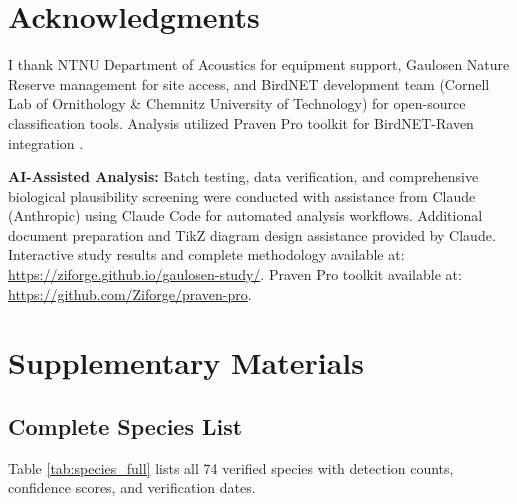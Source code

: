 \documentclass[twocolumn]{article}
\begin{document}
\section*{Acknowledgments}

I thank NTNU Department of Acoustics for equipment support, Gaulosen Nature Reserve management for site access, and BirdNET development team (Cornell Lab of Ornithology \& Chemnitz University of Technology) for open-source classification tools. Analysis utilized Praven Pro toolkit for BirdNET-Raven integration \citep{Redpath2025}.

\textbf{AI-Assisted Analysis:} Batch testing, data verification, and comprehensive biological plausibility screening were conducted with assistance from Claude (Anthropic) using Claude Code for automated analysis workflows. Additional document preparation and TikZ diagram design assistance provided by Claude. Interactive study results and complete methodology available at: \url{https://ziforge.github.io/gaulosen-study/}. Praven Pro toolkit available at: \url{https://github.com/Ziforge/praven-pro}.


\newpage
\onecolumn

\appendix
\section{Supplementary Materials}

\subsection{Complete Species List}

Table \ref{tab:species_full} lists all 74 verified species with detection counts, confidence scores, and verification dates.
\end{document}
